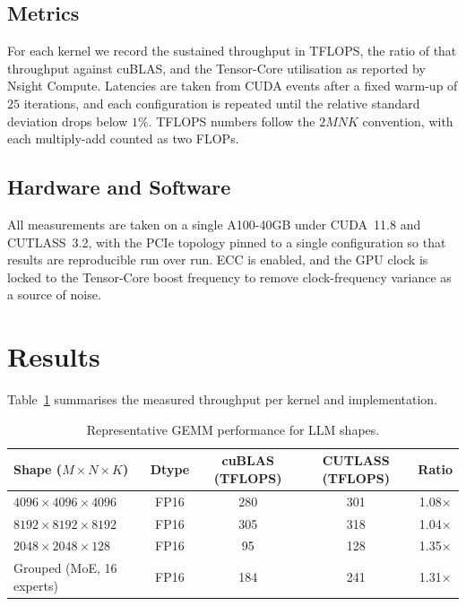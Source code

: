 \subsection{Metrics}\label{sec:cutlass_method_metrics}
For each kernel we record the sustained throughput in TFLOPS, the
ratio of that throughput against cuBLAS, and the Tensor-Core
utilisation as reported by Nsight Compute. Latencies are taken
from CUDA events after a fixed warm-up of $25$ iterations, and
each configuration is repeated until the relative standard
deviation drops below $1\%$. TFLOPS numbers follow the $2MNK$
convention, with each multiply-add counted as two FLOPs.

\subsection{Hardware and Software}\label{sec:cutlass_method_hw}
All measurements are taken on a single A100-40GB under CUDA~11.8
and CUTLASS~3.2, with the PCIe topology pinned to a single
configuration so that results are reproducible run over run. ECC
is enabled, and the GPU clock is locked to the Tensor-Core boost
frequency to remove clock-frequency variance as a source of noise.

\section{Results}\label{sec:cutlass_numbers}
Table~\ref{tab:cutlass_gemm} summarises the measured throughput
per kernel and implementation.

\begin{table}[h]
\centering
\caption{Representative GEMM performance for LLM shapes.}
\label{tab:cutlass_gemm}
\begin{tabular}{lcccc}
\toprule
\textbf{Shape ($M{\times}N{\times}K$)} & \textbf{Dtype} & \textbf{cuBLAS (TFLOPS)} & \textbf{CUTLASS (TFLOPS)} & \textbf{Ratio} \\
\midrule
$4096 \times 4096 \times 4096$ & FP16 & 280 & 301 & 1.08$\times$ \\
$8192 \times 8192 \times 8192$ & FP16 & 305 & 318 & 1.04$\times$ \\
$2048 \times 2048 \times 128$  & FP16 &  95 & 128 & 1.35$\times$ \\
Grouped (MoE, 16 experts)      & FP16 & 184 & 241 & 1.31$\times$ \\
\bottomrule
\end{tabular}
\end{table}

